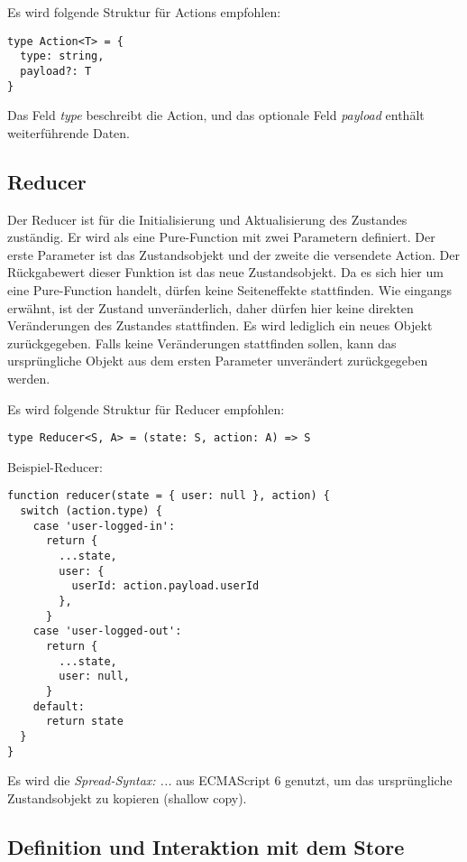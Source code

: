 Es wird folgende Struktur für Actions empfohlen:
\begin{lstlisting}
type Action<T> = {
  type: string,
  payload?: T
}
\end{lstlisting}

Das Feld \textit{type} beschreibt die Action, und das optionale Feld \textit{payload} enthält weiterführende Daten.

\subsection{Reducer}

Der Reducer ist für die Initialisierung und Aktualisierung des Zustandes zuständig. Er wird als eine Pure-Function mit zwei Parametern definiert.
Der erste Parameter ist das Zustandsobjekt und der zweite die versendete Action. Der Rückgabewert dieser Funktion ist das neue Zustandsobjekt. Da es sich hier um eine Pure-Function handelt, dürfen keine Seiteneffekte stattfinden. Wie eingangs erwähnt, ist der Zustand unveränderlich, daher dürfen hier keine direkten Veränderungen des Zustandes stattfinden. Es wird lediglich ein neues Objekt zurückgegeben. Falls keine Veränderungen stattfinden sollen, kann das ursprüngliche Objekt aus dem ersten Parameter unverändert zurückgegeben werden.\cite{reduxStateActionReducers}

Es wird folgende Struktur für Reducer empfohlen:
\begin{lstlisting}
type Reducer<S, A> = (state: S, action: A) => S
\end{lstlisting}

Beispiel-Reducer:

\begin{lstlisting}
function reducer(state = { user: null }, action) {
  switch (action.type) {
    case 'user-logged-in':
      return {
        ...state,
        user: {
          userId: action.payload.userId
        },
      }
    case 'user-logged-out':
      return {
        ...state,
        user: null,
      }
    default:
      return state
  }
}
\end{lstlisting}

Es wird die \textit{Spread-Syntax: ...} aus ECMAScript 6 genutzt, um das ursprüngliche Zustandsobjekt zu kopieren (shallow copy).\cite{mdnSpreadSyntax}

\subsection{Definition und Interaktion mit dem Store}

